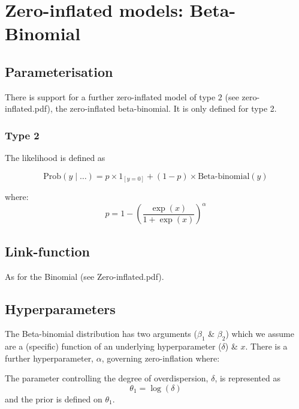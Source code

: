 \documentclass[a4paper,11pt]{article}
\begin{document}
\section*{Zero-inflated models: Beta-Binomial}

\subsection*{Parameterisation}

There is support for a further zero-inflated model of type $2$ (see
zero-inflated.pdf), the zero-inflated beta-binomial.  It is only
defined for type 2.

\subsubsection*{Type 2}

The likelihood is defined as

\begin{displaymath}
    \text{Prob}(y \mid \ldots ) = p \times 1_{[y=0]} +
    (1-p)\times \text{Beta-binomial}(y)
\end{displaymath}

where:
\begin{displaymath}
    p = 1-\left( \frac{\exp(x)}{1 + \exp(x)}\right)^{\alpha}
\end{displaymath}

\subsection*{Link-function}

As for the Binomial (see Zero-inflated.pdf).

\subsection*{Hyperparameters}

The Beta-binomial distribution has two arguments ($\beta_1$ \&
$\beta_2$) which we assume are a (specific) function of an underlying
hyperparameter ($\delta$) \& $x$. There is a further hyperparameter,
$\alpha$, governing zero-inflation where:

\vspace{5mm}

\noindent
The parameter controlling the degree of overdispersion, $\delta$, is
represented as
\begin{displaymath}
    \theta_{1} = \log(\delta)
\end{displaymath}
and the prior is defined on $\theta_{1}$.
\end{document}
